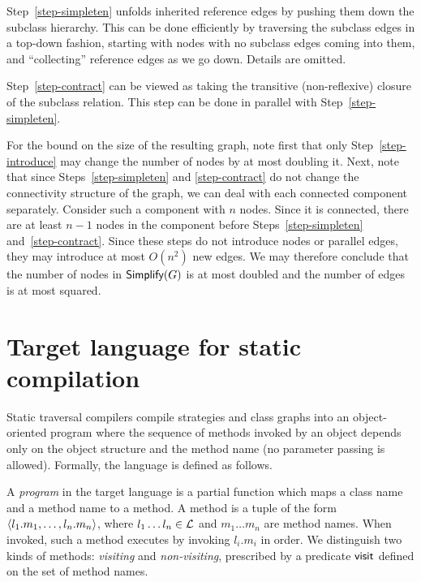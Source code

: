 Step~\ref{step-simpleten} unfolds inherited reference edges by pushing
them down the subclass hierarchy.  This can be done efficiently by
traversing the subclass edges in a top-down fashion, starting with
nodes with no subclass edges coming into them, and ``collecting''
reference edges as we go down. Details are omitted.

Step~\ref{step-contract} can be viewed as taking the transitive
(non-reflexive) closure of the subclass relation. This step can be
done in parallel with Step~\ref{step-simpleten}.

For the bound on the size of the resulting graph, note first that only
Step~\ref{step-introduce} may change the number of nodes by at most
doubling it.  Next, note that since Steps~\ref{step-simpleten} and
\ref{step-contract} do not change the connectivity structure of the
graph, we can deal with each connected component separately. Consider
such a component with $n$ nodes. Since it is connected, there are at
least $n-1$ nodes in the component before Steps~\ref{step-simpleten}
and~\ref{step-contract}.  Since these steps do not introduce nodes or
parallel edges, they may introduce at most $O(n^2)$ new edges.  We may
therefore conclude that the number of nodes in $\mbox{\sf Simplify}(G)$ is at most
doubled and the number of edges is at most squared.


\section{Target language for static compilation}
\label{sec-target}
Static traversal compilers compile strategies and class graphs into an
object-oriented program where the sequence of methods invoked by an
object depends only on the object structure and the method name (no
parameter passing is allowed).  Formally, the language is defined as
follows.

A {\em program} in the target language is a partial function which
maps a class name and a method name to a method.  A method is a tuple
of the form $\langle{l_1.m_1,\ldots, l_n.m_n}\rangle$, where $l_1\ldots l_n
\in{\cal L}$ and $m_1\ldots m_n$ are method names.  When invoked, such a
method executes by invoking $l_i.m_i$ in order.  We distinguish two
kinds of methods: {\em visiting} and {\em non-visiting}, prescribed by
a predicate $\mbox{\sf visit}$ defined on the set of method names.

